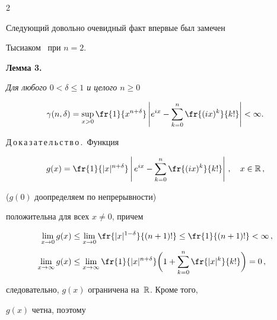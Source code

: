 \begin{multicols}{2}
\smallskip





Следующий довольно очевидный факт впервые был замечен


Тысиаком~\cite{Tysiak1983} при $n=2$.





\bigskip





\noindent


\textbf{Лемма 3.} %


\textit{Для любого $0<\delta\le1$  и целого $n\ge0$}


$$


\gamma (n,\delta)= \sup\limits_{x>0} \fr{1}{x^{n+\delta}}\left\vert e^{ix}-


\sum\limits_{k=0}^n {\fr{(ix)^k}{k!}}\right\vert <\infty.


$$


\smallskip





\noindent


Д\,о\,к\,а\,з\,а\,т\,е\,л\,ь\,с\,т\,в\,о\,.\ Функция


$$


g(x)=\fr{1}{|x|^{n+\delta}}\left|\,e^{ix}-\sum\limits_{k=0}^n


{\fr{(ix)^k}{k!}}\right|\,,\quad x\in\R\,,


$$


($g(0)$ доопределяем по непрерывности) 


положительна для всех $x\neq0$, причем


\begin{align*}


\lim_{x \rightarrow 0}{g(x)}&\le \lim_{x \rightarrow


0}{\fr{|x|^{1-\delta}}{(n+1)!}}\le \fr{1}{(n+1)!}<\infty\,,\\[3pt]


\lim_{x \to \infty}{g(x)}&\le \lim_{x \to \infty}\fr{1}{|x|^{n+\delta}}


\bigg(1+\sum\limits_{k=0}^n{\fr{|x|^k}{k!}}\bigg)=0\,,


\end{align*}


следовательно, $g(x)$ ограничена на~$\mathbb R$. Кроме того,


$g(x)$ четна, поэтому


$$



\end{multicols}
